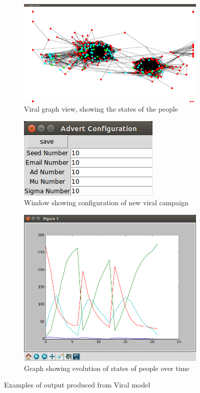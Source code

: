 \documentclass[12pt,a4paper]{article}
\begin{document}
\begin{figure}
\centering
	\begin{subfigure}[b]{0.3\linewidth}
	\caption{Viral graph view, showing the states of the people}
	\label{fig:viralStates}
	\includegraphics[scale=0.1]{Viral1.png}
	\end{subfigure}

	\begin{subfigure}[b]{0.3\linewidth}
	\caption{Window showing configuration of new viral campaign}
	\label{fig:viralConfig}
	\includegraphics[scale=0.3]{Viral2.png}
	\end{subfigure}
\quad
	\begin{subfigure}[b]{0.3\linewidth}
	\caption{Graph showing evolution of states of people over time}
	\label{fig:viralGraph}
	\includegraphics[scale=0.2]{Viral3.png}
	\end{subfigure}
\caption{Examples of output produced from Viral model}
\label{fig:viral}
\end{figure}
\end{document}
